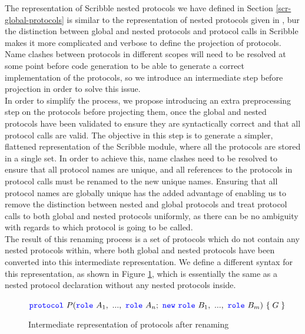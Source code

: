 \documentclass[12pt,twoside]{report}
\begin{document}
The representation of Scribble nested protocols we have defined in Section \ref{scr-global-protocols} is similar to the representation of nested protocols given in \cite{nestedprotocols}, bur the distinction between global and nested protocols and protocol calls in Scribble makes it more complicated and verbose to define the projection of protocols.  Name clashes between protocols in different scopes will need to be resolved at some point before code generation to be able to generate a correct implementation of the protocols, so we introduce an intermediate step before projection in order to solve this issue.\\

In order to simplify the process, we propose introducing an extra preprocessing step on the protocols before projecting them, once the global and nested protocols have been validated to ensure they are syntactically correct and that all protocol calls are valid. The objective in this step is to generate a simpler, flattened representation of the Scribble module, where all the protocols are stored in a single set. In order to achieve this, name clashes need to be resolved to ensure that all protocol names are unique, and all references to the protocols in protocol calls must be renamed to the new unique names. Ensuring that all protocol names are globally unique has the added advantage of enabling us to remove the distinction between nested and global protocols and treat protocol calls to both global and nested protocols uniformly, as there can be no ambiguity with regards to which protocol is going to be called.\\

The result of this renaming process is a set of protocols which do not contain any nested protocols within, where both global and nested protocols have been converted into this intermediate representation. We define a different syntax for this representation, as shown in Figure \ref{protocols-after-renaming}, which is essentially the same as a nested protocol declaration without any nested protocols inside.\\

\begin{figure}[h!]
    \centering
    $\protocol\ P(\role\ A_1,\ ...,\ \role\ A_n;\ \scrnew\ \role\ B_1,\ ...,\ \role\ B_m)\ \{\;G\;\}$\\
    \caption{Intermediate representation of protocols after renaming}
    \label{protocols-after-renaming}
\end{figure}
\end{document}
